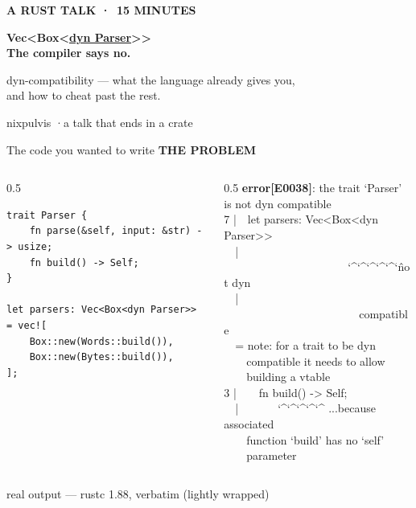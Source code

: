 \documentclass[aspectratio=169,11pt,t]{beamer}
\newcommand{\eyebrow}[2][steel]{{\ttfamily\scriptsize\bfseries\color{#1}\MakeUppercase{#2}}\par\vspace{0.4em}}
\newcommand{\lede}[1]{{\color{muted}\fontsize{13}{18.5}\selectfont #1\par}}
\newcommand{\dnote}[1]{{\ttfamily\scriptsize\color{dim}#1\par}}
\newcommand{\ox}[1]{{\color{oxide}#1}}
\begin{document}
\setlength{\parindent}{0pt}

{
\begin{frame}[plain,c]
\vfill
\eyebrow[dim]{A Rust talk · \,15 minutes}
\vspace{1.2em}

{\ttfamily\LARGE\bfseries\color{text}Vec<Box<{\color{err}\uline{dyn Parser}}>>}\\[0.7em]
{\fontsize{40}{44}\selectfont\bfseries\color{text}The compiler says \ox{no.}}\\[0.9em]
\lede{dyn-compatibility --- what the language already gives you,\\ and how to cheat past the rest.}
\vfill
\dnote{\color{muted}nixpulvis \quad·\quad a talk that ends in a crate}
\end{frame}
}

\begin{frame}[fragile]{The code you wanted to write}
\eyebrow{The problem}
\begin{columns}[T]
\begin{column}{0.5\textwidth}
\begin{lstlisting}
trait Parser {
    fn parse(&self, input: &str) -> usize;
    fn build() -> Self;
}

let parsers: Vec<Box<dyn Parser>> = vec![
    Box::new(Words::build()),
    Box::new(Bytes::build()),
];
\end{lstlisting}
\end{column}
\begin{column}{0.5\textwidth}
{\ttfamily\footnotesize
{\color{err}\bfseries error[E0038]}{\color{text}: the trait `Parser'}\\
{\color{text}is not dyn compatible}\\[3pt]
{\color{steel}7 |}\ \ let parsers: Vec<Box<dyn Parser>>\\
{\color{steel}\ \ |}\ \ \ \ \ \ \ \ \ \ \ \ \ \ \ \ \ \ \ \ \ \ {\color{err}\char`\^\char`\^\char`\^\char`\^\char`\^\char`\^ not dyn}\\
{\color{steel}\ \ |}\ \ \ \ \ \ \ \ \ \ \ \ \ \ \ \ \ \ \ \ \ \ \ \ {\color{err}compatible}\\[3pt]
{\color{steel}\ \ = note:} for a trait to be dyn\\
\ \ \ \ compatible it needs to allow\\
\ \ \ \ building a vtable\\[3pt]
{\color{steel}3 |}\ \ \ \ fn build() -> Self;\\
{\color{steel}\ \ |}\ \ \ \ \ \ \ {\color{err}\char`\^\char`\^\char`\^\char`\^\char`\^} ...because associated\\
\ \ \ \ function `build' has no `self'\\
\ \ \ \ parameter\\
}
\end{column}
\end{columns}
\vspace{0.8em}
\dnote{real output --- rustc 1.88, verbatim (lightly wrapped)}
\end{frame}
\end{document}
